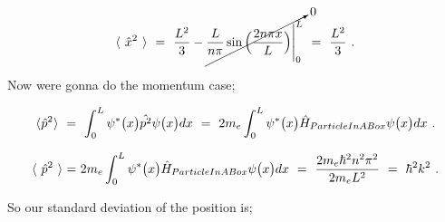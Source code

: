 \documentclass{article}
\begin{document}
\begin{equation} \label{eq:255}
\langle \hspace{0.125cm} \hat{x}^{2} \hspace{0.125cm} \rangle \hspace{0.125cm} = \hspace{0.125cm} \frac{L^2}{3} - \cancelto{0}{\frac{L}{n \pi} \sin\Big(\frac{2 n \pi x}{L}\Big) \Bigg|_{0}^{L}} \hspace{0.125cm} = \hspace{0.125cm} \frac{L^2}{3} \hspace{0.125cm} .
\end{equation}

Now were gonna do the momentum case;

\begin{equation} \label{eq:254}
\langle \hspace{0.0125cm} \hat{p}^{2} \hspace{0.0125cm} \rangle \hspace{0.125cm} = \hspace{0.125cm} \int_{0}^{L} \psi^{\ast}\big(x\big) \hat{p^{2}} \psi\big(x\big) dx \hspace{0.125cm} = \hspace{0.125cm} 2 m_e \int_{0}^{L} \psi^{\ast}\big(x\big) \hat{H}_{ParticleInABox} \psi\big(x\big) dx \hspace{0.125cm}  .
\end{equation}

\begin{equation} \label{eq:254}
\langle \hspace{0.125cm} \hat{p}^{2} \hspace{0.125cm} \rangle \hspace{0.0125cm} = \hspace{0.0125cm} 2 m_e \int_{0}^{L} \psi^{\ast}\big(x\big) \hat{H}_{ParticleInABox} \psi\big(x\big) dx \hspace{0.125cm} = \hspace{0.125cm} \frac{2 m_e \hbar^{2} n^2 \pi^{2}}{2 m_e L^2} \hspace{0.125cm} = \hspace{0.125cm} \hbar^{2} k^2 \hspace{0.125cm}  .
\end{equation}

So our standard deviation of the position is; 
\end{document}
